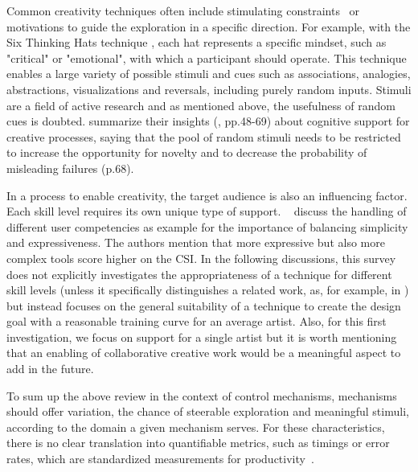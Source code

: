 Common creativity techniques often include stimulating constraints~\cite{onarheim_2010_occ,shih_2011_buc,biskjaer_2014_cud,stokes_2005_ccp} or motivations to guide the exploration in a specific direction. For example, with the Six Thinking Hats technique \cite{debono_1985_sth}, each hat represents a specific mindset, such as "critical" or "emotional", with which a participant should operate. This technique enables a large variety of possible stimuli and cues such as associations, analogies, abstractions, visualizations and reversals, including purely random inputs. Stimuli are a field of active research and as mentioned above, the usefulness of random cues is doubted. \citeauthor*{markman_2009_tis} summarize their insights (\cite{markman_2009_tis}, pp.48-69) about cognitive support for creative processes, saying that the pool of random stimuli needs to be restricted to increase the opportunity for novelty and to decrease the probability of misleading failures (p.68).

In a process to enable creativity, the target audience is also an influencing factor. Each skill level requires its own unique type of support. \citeauthor*{cherry_2014_qcs}~\cite{cherry_2014_qcs} discuss the handling of different user competencies as example for the importance of balancing simplicity and expressiveness. The authors mention that more expressive but also more complex tools score higher on the CSI. In the following discussions, this survey does not explicitly investigates the appropriateness of a technique for different skill levels (unless it specifically distinguishes a related work, as, for example, in \cite{benedetti_2014_pba}) but instead focuses on the general suitability of a technique to create the design goal with a reasonable training curve for an average artist. Also, for this first investigation, we focus on support for a single artist but it is worth mentioning that an enabling of collaborative creative work would be a meaningful aspect to add in the future.


To sum up the above review in the context of control mechanisms, mechanisms should offer variation, the chance of steerable exploration and meaningful stimuli, according to the domain a given mechanism serves. For these characteristics, there is no clear translation into quantifiable metrics, such as timings or error rates, which are standardized measurements for productivity~\cite{cherry_2014_qcs,shneiderman_2007_cst}.

